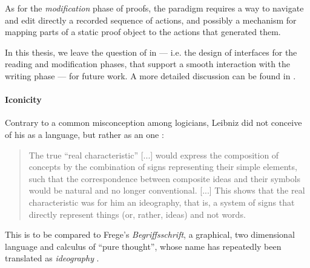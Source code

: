 As for the \emph{modification} phase of proofs, the  paradigm requires a
way to navigate and edit directly a recorded sequence of actions, and possibly a
mechanism for mapping parts of a static proof object to the actions that
generated them.

\begin{emphpar}
  In this thesis, we leave the question of  in  ---
  i.e. the design of interfaces for the reading and modification phases, that
  support a smooth interaction with the writing phase --- for future work. A
  more detailed discussion can be found in .
\end{emphpar}

\paragraph{Iconicity}


Contrary to a common misconception among logicians, Leibniz did not conceive of
his  as a  language, but rather as an
\emph{} one :
\begin{quote}
    The true ``real characteristic'' [...] would express the composition of
    concepts by the combination of signs representing their simple elements,
    such that the correspondence between composite ideas and their symbols would
    be natural and no longer conventional. [...] This shows that the real
    characteristic was for him an ideography, that is, a system of signs that
    directly represent things (or, rather, ideas) and not words.
\end{quote}
This is to be compared to Frege's \textit{Begriffsschrift}, a graphical,
two dimensional language and calculus of ``pure thought'', whose name has
repeatedly been translated as \emph{ideography}
.

